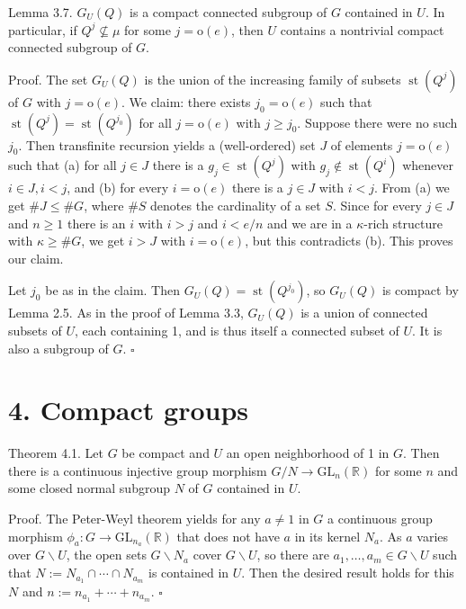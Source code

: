 \documentclass[10pt]{article}
\begin{document}
Lemma 3.7. $G_{U}(Q)$ is a compact connected subgroup of $G$ contained in $U$. In particular, if $Q^{j} \nsubseteq \mu$ for some $j=\mathrm{o}(e)$, then $U$ contains a nontrivial compact connected subgroup of $G$.

Proof. The set $G_{U}(Q)$ is the union of the increasing family of subsets $\operatorname{st}\left(Q^{j}\right)$ of $G$ with $j=\mathrm{o}(e)$. We claim: there exists $j_{0}=\mathrm{o}(e)$ such that $\operatorname{st}\left(Q^{j}\right)=\operatorname{st}\left(Q^{j_{0}}\right)$ for all $j=\mathrm{o}(e)$ with $j \geq j_{0}$. Suppose there were no such $j_{0}$. Then transfinite recursion yields a (well-ordered) set $J$ of elements $j=\mathrm{o}(e)$ such that (a) for all $j \in J$ there is a $g_{j} \in \operatorname{st}\left(Q^{j}\right)$ with $g_{j} \notin \operatorname{st}\left(Q^{i}\right)$ whenever $i \in J, i<j$, and (b) for every $i=\mathrm{o}(e)$ there is a $j \in J$ with $i<j$. From (a) we get $\# J \leq \# G$, where $\# S$ denotes the cardinality of a set $S$. Since for every $j \in J$ and $n \geq 1$ there is an $i$ with $i>j$ and $i<e / n$ and we are in a $\kappa$-rich structure with $\kappa \geq \# G$, we get $i>J$ with $i=\mathrm{o}(e)$, but this contradicts (b). This proves our claim.

Let $j_{0}$ be as in the claim. Then $G_{U}(Q)=\operatorname{st}\left(Q^{j_{0}}\right)$, so $G_{U}(Q)$ is compact by Lemma 2.5. As in the proof of Lemma 3.3, $G_{U}(Q)$ is a union of connected subsets of $U$, each containing 1, and is thus itself a connected subset of $U$. It is also a subgroup of $G$. \(\square\)

\section*{4. Compact groups}
Theorem 4.1. Let $G$ be compact and $U$ an open neighborhood of 1 in $G$. Then there is a continuous injective group morphism $G / N \rightarrow \mathrm{GL}_{n}(\mathbb{R})$ for some $n$ and some closed normal subgroup $N$ of $G$ contained in $U$.

Proof. The Peter-Weyl theorem yields for any $a \neq 1$ in $G$ a continuous group morphism $\phi_{a}: G \rightarrow \mathrm{GL}_{n_{a}}(\mathbb{R})$ that does not have $a$ in its kernel $N_{a}$. As $a$ varies over $G \backslash U$, the open sets $G \backslash N_{a}$ cover $G \backslash U$, so there are $a_{1}, \ldots, a_{m} \in G \backslash U$ such that $N:=N_{a_{1}} \cap \cdots \cap N_{a_{m}}$ is contained in $U$. Then the desired result holds for this $N$ and $n:=n_{a_{1}}+\cdots+n_{a_{m}}$. \(\square\)
\end{document}
